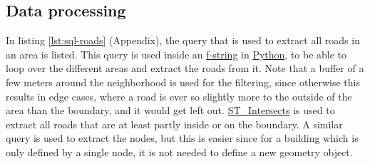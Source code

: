 \subsection{Data processing}
In listing \ref{lst:sql-roads} (Appendix), the query that is used to extract
all roads in an area is listed. This query is used inside an \url{f-string}
in \url{Python}, to be able to loop over the different areas and extract
the roads from it. Note that a buffer of a few meters around the neighborhood
is used for the filtering, since otherwise this results in edge cases,
where a road is ever so slightly more to the outside of the area than the boundary,
and it would get left out. \url{ST_Intersects} is used to extract all roads
that are at least partly inside or on the boundary. A similar query is used 
to extract the nodes, but this is easier since for a building which is only
defined by a single node, it is not needed to define a new geometry object.

